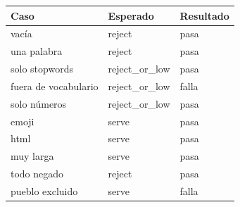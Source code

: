 \begin{tabular}{lll}
\toprule
Caso & Esperado & Resultado \\
\midrule
vacía & reject & pasa \\
una palabra & reject & pasa \\
solo stopwords & reject\_or\_low & pasa \\
fuera de vocabulario & reject\_or\_low & falla \\
solo números & reject\_or\_low & pasa \\
emoji & serve & pasa \\
html & serve & pasa \\
muy larga & serve & pasa \\
todo negado & reject & pasa \\
pueblo excluido & serve & falla \\
\bottomrule
\end{tabular}
